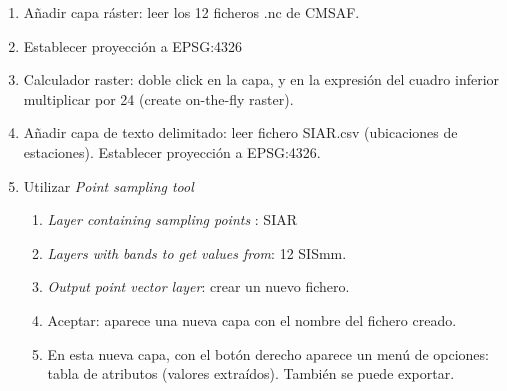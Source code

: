 \documentclass[11pt]{article}
\begin{document}
\begin{enumerate}
\item Añadir capa ráster: leer los 12 ficheros .nc de CMSAF.
\item Establecer proyección a EPSG:4326
\item Calculador raster: doble click en la capa, y en la expresión del
cuadro inferior multiplicar por 24 (create on-the-fly raster).
\item Añadir capa de texto delimitado: leer fichero SIAR.csv (ubicaciones
de estaciones). Establecer proyección a EPSG:4326.
\item Utilizar \emph{Point sampling tool}
\begin{enumerate}
\item \emph{Layer containing sampling points} : SIAR
\item \emph{Layers with bands to get values from}: 12 SISmm.
\item \emph{Output point vector layer}: crear un nuevo fichero.
\item Aceptar: aparece una nueva capa con el nombre del fichero creado.
\item En esta nueva capa, con el botón derecho aparece un menú de
  opciones: tabla de atributos (valores extraídos). También se puede
  exportar.
\end{enumerate}
\end{enumerate}
\end{document}
